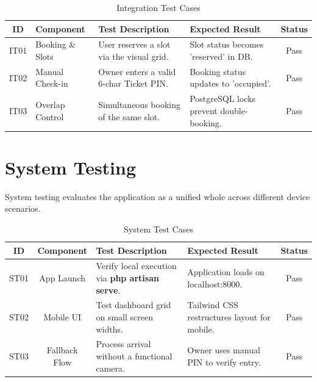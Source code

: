 \begin{table}[H]
    \centering
    \caption{Integration Test Cases}
    \label{tab:integration_tests}
    \renewcommand{\arraystretch}{1.5}
    \small
    \begin{tabular}{|c|p{3.5cm}|p{4cm}|p{4cm}|c|}
        \hline
        \textbf{ID} & \textbf{Component} & \textbf{Test Description} & \textbf{Expected Result} & \textbf{Status} \\
        \hline
        IT01 & Booking \& Slots & User reserves a slot via the visual grid. & Slot status becomes 'reserved' in DB. & Pass \\
        \hline
        IT02 & Manual Check-in & Owner enters a valid 6-char Ticket PIN. & Booking status updates to 'occupied'. & Pass \\
        \hline
        IT03 & Overlap Control & Simultaneous booking of the same slot. & PostgreSQL locks prevent double-booking. & Pass \\
        \hline
    \end{tabular}
\end{table}

\section{System Testing}
System testing evaluates the application as a unified whole across different device scenarios.

\begin{table}[H]
    \centering
    \caption{System Test Cases}
    \label{tab:system_tests}
    \renewcommand{\arraystretch}{1.5}
    \begin{tabular}{|c|c|p{4cm}|p{3.5cm}|c|}
        \hline
        \textbf{ID} & \textbf{Component} & \textbf{Test Description} & \textbf{Expected Result} & \textbf{Status} \\
        \hline
        ST01 & App Launch & Verify local execution via \textbf{php artisan serve}. & Application loads on localhost:8000. & Pass \\
        \hline
        ST02 & Mobile UI & Test dashboard grid on small screen widths. & Tailwind CSS restructures layout for mobile. & Pass \\
        \hline
        ST03 & Fallback Flow & Process arrival without a functional camera. & Owner uses manual PIN to verify entry. & Pass \\
        \hline
    \end{tabular}
\end{table}

